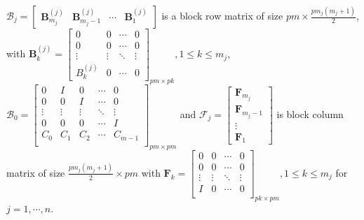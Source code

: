 \documentclass[12pt, reqno]{amsart}
\theoremstyle{definition}
\theoremstyle{remark}
\numberwithin{equation}{section}
\begin{document}
\noindent
$\mathcal{B}_j = \begin{bmatrix}
\textbf{B}_{m_j}^{(j)} & \textbf{B}_{m_j-1}^{(j)} & \cdots & \textbf{B}_1^{(j)}
\end{bmatrix}$ is a block row matrix of size $\displaystyle pm \times 
\frac{pm_j(m_j+1)}{2}$, with $\textbf{B}_k^{(j)} = \begin{bmatrix}
0 & 0 & \cdots & 0 \\
0 & 0 & \cdots & 0 \\
\vdots & \vdots & \ddots & \vdots \\
B_{k}^{(j)} & 0 & \cdots & 0
\end{bmatrix}_{pm \times pk}, 1 \leq k \leq m_j $, \\
$\mathcal{B}_0 = \begin{bmatrix}
0 & I & 0 & \cdots & 0\\
0 & 0 & I & \cdots & 0\\
\vdots & \vdots & \vdots & \ddots & \vdots\\
0 & 0 & 0 & \cdots & I\\
C_0 & C_1 & C_2 & \cdots & C_{m-1}\\ 
\end{bmatrix}_{pm \times pm}$ and
$\mathcal{F}_j = \begin{bmatrix}
\textbf{F}_{m_j} \\
\textbf{F}_{m_j-1} \\
\vdots \\
\textbf{F}_1
\end{bmatrix}$ is block column \\
matrix of size $\displaystyle \frac{pm_j(m_j+1)}{2} 
\times pm$ with $ \textbf{F}_k =\begin{bmatrix}
0 & 0 & \cdots & 0\\
0 & 0 & \cdots & 0\\
\vdots & \vdots & \ddots & \vdots \\
I & 0 & \cdots & 0 \\
\end{bmatrix}_{pk \times pm}, 1 \leq k \leq m_j$ for $j = 1,\cdots, n$.
\end{document}
